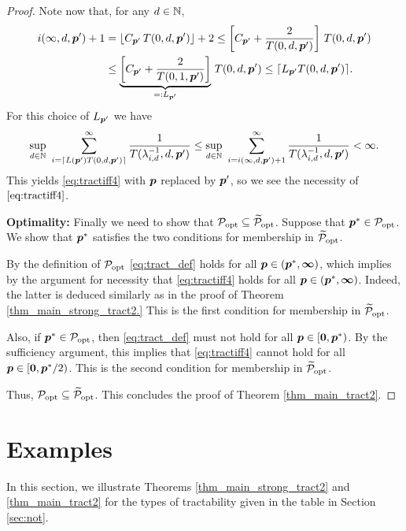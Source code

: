 \documentclass[11pt,a4paper]{article}
\begin{document}
\begin{proof}
Note now that, for any $d\in\mathbb{N}$,
\begin{align*}
 i(\infty,d,\boldsymbol{p}') +1  & = \lfloor C_{\boldsymbol{p}'}\, T(0,d,\boldsymbol{p}')\rfloor +2 \le  \left[C_{\boldsymbol{p}'} + \frac{2}{T(0,d,\boldsymbol{p}')}   \right]\, T(0,d,\boldsymbol{p}')\\
 & \le  \underbrace{\left[C_{\boldsymbol{p}'} + \frac{2}{T(0,1,\boldsymbol{p}')}   \right]}_{=:L_{\boldsymbol{p}'}}\, T(0,d,\boldsymbol{p}')
 \le \lceil L_{\boldsymbol{p}'} T(0,d,\boldsymbol{p}')\rceil .
\end{align*}
For this choice of $L_{\boldsymbol{p}'}$ we have
\[
\sup_{d\in\mathbb{N}}\,\, \sum_{i=\lceil L(\boldsymbol{p}') T(0,d,\boldsymbol{p}')\rceil}^\infty \frac{1}{T(\lambda_{i,d}^{-1},d, \boldsymbol{p}')}
\le
\sup_{d\in\mathbb{N}} \, \, \sum_{i=i (\infty,d,\boldsymbol{p}')+1}^\infty \frac{1}{T (\lambda_{i,d}^{-1},d,\boldsymbol{p}')} <
\infty.
\]
This yields \eqref{eq:tractiff4} with $\boldsymbol{p}$ replaced by $\boldsymbol{p}'$, so we see the necessity of $\eqref{eq:tractiff4}$.

\bigskip

\noindent \textbf{Optimality:}
Finally we need to show that $\mathcal{P}_{\textup{opt}} \subseteq \widetilde{\mathcal{P}}_{\textup{opt}}$.  Suppose that  $\boldsymbol{p}^* \in \mathcal{P}_{\textup{opt}}$.  We show that $\boldsymbol{p}^*$ satisfies the two conditions for membership in $\widetilde{\mathcal{P}}_{\textup{opt}}$.

By the definition of  $\mathcal{P}_{\textup{opt}}$ \eqref{eq:tract_def}  holds for all $\boldsymbol{p} \in (\boldsymbol{p}^*,\boldsymbol{\infty})$, which implies by the argument for necessity that  \eqref{eq:tractiff4} holds for all $\boldsymbol{p} \in (\boldsymbol{p}^*,\boldsymbol{\infty})$.  Indeed, the latter is deduced similarly as in the proof of Theorem \ref{thm_main_strong_tract2.}
This is the first condition for membership in $\widetilde{\mathcal{P}}_{\textup{opt}}$.

Also, if  $\boldsymbol{p}^* \in \mathcal{P}_{\textup{opt}}$, then \eqref{eq:tract_def} must not hold for all $\boldsymbol{p} \in [\boldsymbol{0}, \boldsymbol{p}^*)$.  By the sufficiency argument, this implies that \eqref{eq:tractiff4} cannot hold for all $\boldsymbol{p} \in [\boldsymbol{0},\boldsymbol{p}^*/2)$.  This is the second condition for membership in $\widetilde{\mathcal{P}}_{\textup{opt}}$.

Thus,  $\mathcal{P}_{\textup{opt}} \subseteq \widetilde{\mathcal{P}}_{\textup{opt}}$.  This concludes the proof of Theorem \ref{thm_main_tract2}.

\end{proof}


\section{Examples} \label{sec:examples}

In this section, we illustrate Theorems \ref{thm_main_strong_tract2} and \ref{thm_main_tract2} for the types of tractability given in the table in Section \ref{sec:not}.
\end{document}
